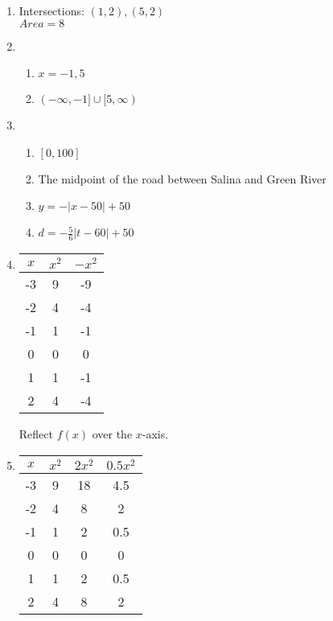 \documentclass{article}
\begin{document}
\begin{enumerate}
\item Intersections: $(1, 2), (5, 2)$ \\
	$Area = 8$

\item
	\begin{enumerate}
	
	\item $x = -1, 5$
	
	\item $(-\infty, -1] \cup [5, \infty)$
	
	\end{enumerate}
	
\item

	\begin{enumerate}
	
	\item $[0, 100]$
	
	\item The midpoint of the road between Salina and Green River
	
	\item $y = -|x - 50| + 50$
	
	\item $d = -\frac{5}{6}|t - 60| + 50$	
	
	\end{enumerate}
	
\item

	\begin{tabular}{c | c | c}
	$x$ & $x^2$ & $-x^2$ \\
	\hline
	-3 & 9 & -9 \\
	-2 & 4 & -4 \\
	-1 & 1 & -1 \\
	0 & 0 & 0 \\
	1 & 1 & -1 \\
	2 & 4 & -4
	\end{tabular}
	
	Reflect $f(x)$ over the $x$-axis.
	
\item

	\begin{tabular}{c | c | c | c}
	$x$ & $x^2$ & $2x^2$ & $0.5x^2$ \\
	\hline
	-3 & 9 & 18 & 4.5 \\
	-2 & 4 & 8 & 2 \\
	-1 & 1 & 2 & 0.5 \\
	0 & 0 & 0 & 0 \\
	1 & 1 & 2 & 0.5 \\
	2 & 4 & 8 & 2
	\end{tabular}
	

\end{enumerate}
\end{document}
